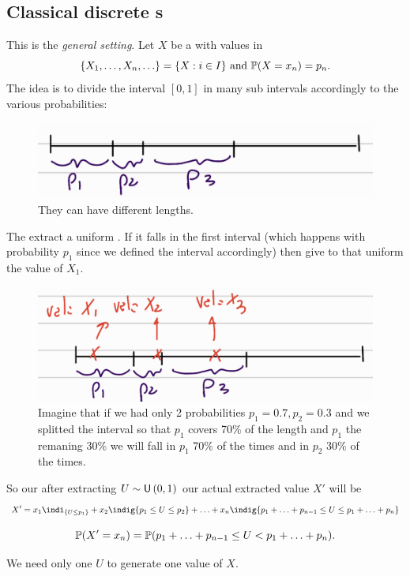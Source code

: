 \documentclass[12pt]{report}
\begin{document}
\subsection{Classical discrete \rv s}
This is the \emph{general setting}. Let $X$ be a \rv{} with values in 
\begin{equation*}
	\{X_{1},\ldots,X_{n},\ldots\}=\{X:i\in I\}\text{ and }\mathbb{P}(X=x_{n})=p_{n}.
\end{equation*}
The idea is to divide the interval $[0,1]$ in many sub intervals accordingly to the various probabilities:
\begin{figure}[H]
	\centering
	\includegraphics[width=0.5\linewidth]{img/screenshot061}
	\caption{They can have different lengths.}
	\label{fig:screenshot061}
\end{figure}
The extract a uniform \rv. If it falls in the first interval (which happens with probability $p_{1}$ since we defined the interval accordingly) then give to that uniform \rv{} the value of $X_{1}$.
\begin{figure}[H]
	\centering
	\includegraphics[width=0.5\linewidth]{img/screenshot062}
	\caption{Imagine that if we had only 2 probabilities $p_1=0.7, p_2=0.3$ and we splitted the interval so that $p_1$ covers 70\% of the length and $p_1$ the remaning 30\% we will fall in $p_1$ 70\% of the times and in $p_2$ 30\% of the times.}
	\label{fig:screenshot062}
\end{figure}
So our after extracting $U\sim\mathsf{U}\left(0,1\right)$ our actual extracted value $X'$ will be
\begin{equation*}
	X'=x_{1}\indi_{\{U\leq p_{1}\}}+x_{2}\indig{p_{1}\leq U\leq p_{2}}+\ldots+x_{n}\indig{p_{1}+\ldots+p_{n-1}\leq U\leq p_{1}+\ldots+p_{n}}
\end{equation*}
\begin{fancyproof}
	\begin{equation*}
		\mathbb{P}(X'=x_{n})=\mathbb{P}(p_{1}+\ldots+p_{n-1}\leq U<p_{1}+\ldots+p_{n}).
	\end{equation*}
\end{fancyproof}
\begin{remark}
	We need only one \rv{} $U$ to generate one value of $X$.
\end{remark} 
\end{document}
